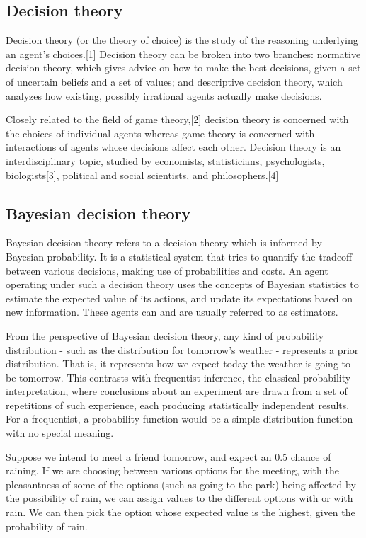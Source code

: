 \subsection*{Decision theory}

Decision theory (or the theory of choice) is the study of the reasoning underlying an agent's choices.[1] Decision theory can be broken into two branches: normative decision theory, which gives advice on how to make the best decisions, given a set of uncertain beliefs and a set of values; and descriptive decision theory, which analyzes how existing, possibly irrational agents actually make decisions.

Closely related to the field of game theory,[2] decision theory is concerned with the choices of individual agents whereas game theory is concerned with interactions of agents whose decisions affect each other. Decision theory is an interdisciplinary topic, studied by economists, statisticians, psychologists, biologists[3], political and social scientists, and philosophers.[4]

\subsection*{Bayesian decision theory}
Bayesian decision theory refers to a decision theory which is informed by Bayesian probability. It is a statistical system that tries to quantify the tradeoff between various decisions, making use of probabilities and costs. An agent operating under such a decision theory uses the concepts of Bayesian statistics to estimate the expected value of its actions, and update its expectations based on new information. These agents can and are usually referred to as estimators. 

From the perspective of Bayesian decision theory,  any kind of probability distribution - such as the distribution for tomorrow's weather - represents a prior distribution. That is, it represents how we expect today the weather is going to be tomorrow. This contrasts with frequentist inference, the classical probability interpretation, where conclusions about an experiment are drawn from a set of repetitions of such experience, each producing statistically independent results. For a frequentist, a probability function would be a simple distribution function with no special meaning. 

Suppose we intend to meet a friend tomorrow, and expect an 0.5 chance of raining. If we are choosing between various options for the meeting, with the pleasantness of some of the options (such as going to the park) being affected by the possibility of rain, we can assign values to the different options with or with rain. We can then pick the option whose expected value is the highest, given the probability of rain. 

